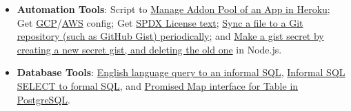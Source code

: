 \begin{itemize}[noitemsep, leftmargin=*]
  \item \textbf{Automation Tools}:
    Script to \href{https://github.com/nodef/heroku-addonpool}{Manage Addon Pool of an App in Heroku};
    Get \href{https://github.com/nodef/extra-gcpconfig}{GCP}/\href{https://github.com/nodef/extra-awsconfig}{AWS} config;
    Get \href{https://github.com/nodef/extra-license}{SPDX License text};
    \href{https://github.com/javascriptf/script-git-sync-file}{Sync a file to a Git repository (such as GitHub Gist) periodically}; and
    \href{https://github.com/javascriptf/script-gist-conceal}{Make a gist secret by creating a new secret gist, and deleting the old one} in Node.js.
  \item \textbf{Database Tools}:
    \href{https://github.com/nodef/pg-english}{English language query to an informal SQL},
    \href{https://github.com/nodef/pg-slang}{Informal SQL SELECT to formal SQL}, and
    \href{https://github.com/nodef/map-pg}{Promised Map interface for Table in PostgreSQL}.
\end{itemize}

